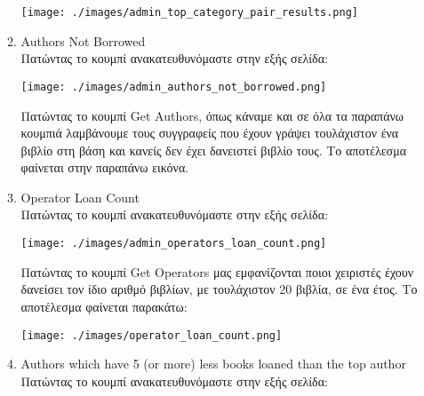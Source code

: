 \documentclass[14pt]{report}
\begin{document}
\begin{enumerate}
\begin{enumerate}
			\vspace{\baselineskip}
			
			\texttt{[image: ./images/admin\_top\_category\_pair\_results.png]}
			
			\vspace{\baselineskip}
			
			\newpage
			\hypertarget{a-authors-not-borrowed}{}
			\item  Authors Not Borrowed \\
			Πατώντας το κουμπί ανακατευθυνόμαστε στην εξής σελίδα: \\
			
			\vspace{\baselineskip}
			
			\texttt{[image: ./images/admin\_authors\_not\_borrowed.png]}
			
			\vspace{\baselineskip}
			
			Πατώντας το κουμπί Get Authors, όπως κάναμε και σε όλα τα παραπάνω κουμπιά λαμβάνουμε τους συγγραφείς που έχουν γράψει τουλάχιστον ένα βιβλίο στη βάση και κανείς δεν έχει δανειστεί βιβλίο τους. Το αποτέλεσμα φαίνεται στην παραπάνω εικόνα.
			
			\newpage
			\hypertarget{a-operator-loan-count}{}
			\item Operator Loan Count \\
			Πατώντας το κουμπί ανακατευθυνόμαστε στην εξής σελίδα: \\
			
			\vspace{\baselineskip}
			
			\texttt{[image: ./images/admin\_operators\_loan\_count.png]}
			
			\vspace{\baselineskip}
			
			Πατώντας το κουμπί Get Operators μας εμφανίζονται ποιοι χειριστές έχουν δανείσει τον ίδιο αριθμό βιβλίων, με τουλάχιστον 20 βιβλία, σε ένα έτος. Το αποτέλεσμα φαίνεται παρακάτω: \\
			
			\vspace{\baselineskip}
			
			\texttt{[image: ./images/operator\_loan\_count.png]}
			
			\vspace{\baselineskip}
			
			\newpage
			\hypertarget{a-authors-less-books}{}
			\item Authors which have 5 (or more) less books loaned than the top author \\
			Πατώντας το κουμπί ανακατευθυνόμαστε στην εξής σελίδα: \\
			

\end{enumerate}
\end{enumerate}
\end{document}
